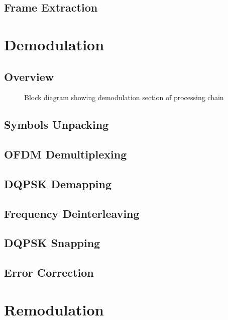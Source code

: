 \documentclass[class=report,11pt,crop=false]{standalone}
\begin{document}
\subsection{Frame Extraction \label{subsect:dab-proc_frame-extract}}



\section{Demodulation \label{sect:dab-proc_demodulate}}
\subsection{Overview}

\begin{figure}[htbp]
    \centering
    \def\svgwidth{\linewidth}
    { %
        }
    \caption{Block diagram showing demodulation section of processing chain}
    \label{fig:BD_Demod_All}
\end{figure}


\subsection{Symbols Unpacking \label{subsect:dab-proc_symbols-unpack}}
\subsection{OFDM Demultiplexing \label{subsect:dab-proc_ofdm-demux}}
\subsection{DQPSK Demapping \label{subsect:dab-proc_dqpsk-demap}}
\subsection{Frequency Deinterleaving \label{subsect:dab-proc_freq-deinterleave}}
\subsection{DQPSK Snapping \label{subsect:dab-proc_dqpsk-snap}}
\subsection{Error Correction \label{subsect:dab-proc_error-correct}}

\section{Remodulation \label{sect:dab-proc_remodulate}}
\end{document}
